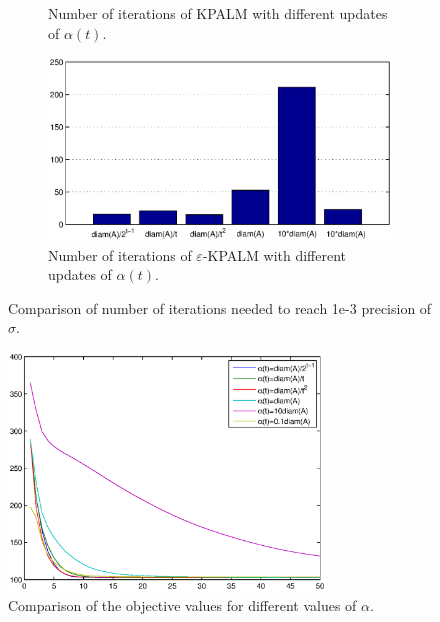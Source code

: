 \begin{figure}
\begin{subfigure}[b]{0.7\textwidth}
        \caption{Number of iterations of KPALM with different updates of $\alpha(t)$.}
        \label{fig:iters_dyn_alpha_kpalm_comp}
    \end{subfigure}
    \begin{subfigure}[b]{0.7\textwidth}
        \includegraphics[width=\textwidth]{iterations_dynamic_alpha_eps_kpalm_comparison}
        \caption{Number of iterations of $\varepsilon$-KPALM with different updates of $\alpha(t)$.}
        \label{fig:iters_dyn_alpha_eps_kpalm_comp}
    \end{subfigure}
    \caption{Comparison of number of iterations needed to reach 1e-3 precision of $\sigma$.}\label{fig:iters_comp}
\end{figure}

\begin{figure}
    \centering
    \includegraphics[width=0.75\textwidth]{dynamic_alpha_eps_kpalm}
    \caption{Comparison of the objective values for different values of $\alpha$.}
    \label{fig:dynamic_alpha_eps_psi_comp}
\end{figure}



